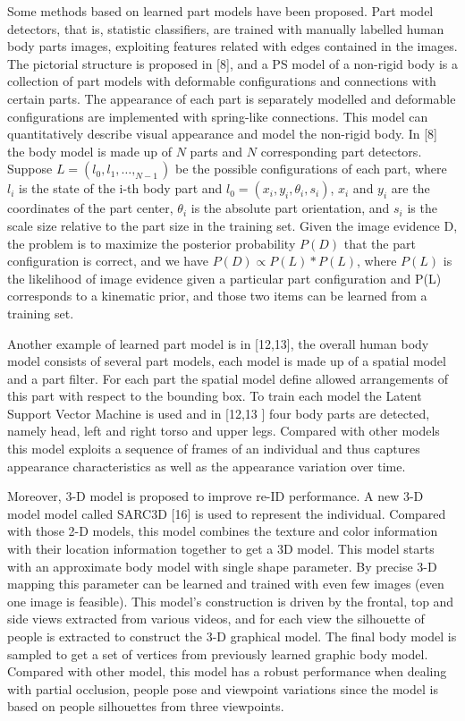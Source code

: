 Some methods based on learned part models have been proposed. Part model detectors, that is, statistic classifiers, are trained with manually labelled human body parts images, exploiting features related with edges contained in the images. The pictorial structure is proposed in [8], and a PS model of a non-rigid body is a collection of part models with deformable configurations and connections with certain parts. The appearance of each part is separately modelled and deformable configurations are implemented with spring-like connections. This model can quantitatively describe visual appearance and model the non-rigid body. In [8] the body model is made up of $N$ parts and $N$ corresponding part detectors. Suppose $L={(l_0,l_1,\ldots,_{N-1})}$ be the possible configurations of each part, where $l_i$ is the state of the i-th body part and $l_0=(x_i,y_i,\theta_i,s_i)$, $x_i$ and $y_i$ are the coordinates of the part center, $\theta_i$ is the absolute part orientation, and $s_i$ is the scale size relative to the part size in the training set.  Given the image evidence D, the problem is to maximize the posterior probability $P(D)$ that the part configuration is correct, and we have $P(D) \propto {P(L)*P(L)}$, where $P(L)$ is the likelihood of image evidence given a particular part configuration and P(L) corresponds to a kinematic prior, and those two items can be learned from a training set.

Another example of learned part model is in [12,13], the overall human body model consists of several part models, each model is made up of a spatial model and a part filter. For each part the spatial model define allowed arrangements of this part with respect to the bounding box. To train each model the Latent Support Vector Machine is used and in [12,13 ] four body parts are detected, namely head, left and right torso and upper legs. Compared with other models this model exploits a sequence of frames of an individual and thus captures appearance characteristics as well as the appearance variation over time.

Moreover, 3-D model is proposed to improve re-ID performance. A new 3-D model model called SARC3D [16] is used to represent the individual. Compared with those 2-D models, this model combines the texture and color information with their location information together to get a 3D model. This model starts with an approximate body model with single shape parameter. By precise 3-D mapping this parameter can be learned and trained with even few images (even one image is feasible). This model's construction is driven by the frontal, top and side views extracted from various videos, and for each view the silhouette of people is extracted to construct the 3-D graphical model. The final body model is sampled to get a set of vertices from previously learned graphic body model. Compared with other model, this model has a robust performance when dealing with partial occlusion, people pose and viewpoint variations since the model is based on people silhouettes from three viewpoints.

